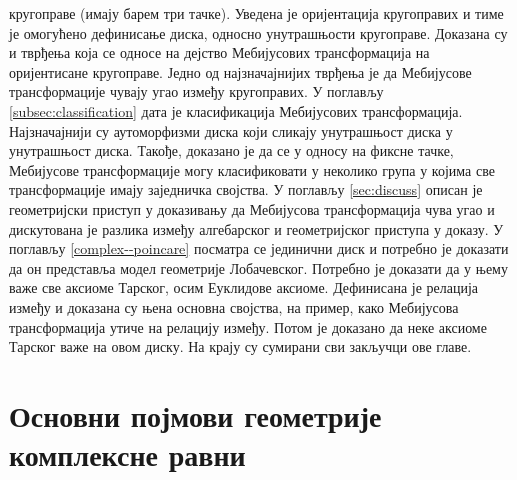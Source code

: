 кругоправе (имају барем три тачке). Уведена је оријентација
кругоправих и тиме је омогућено дефинисање диска, односно унутрашњости
кругоправе. Доказана су и тврђења која се односе на дејство
Мебијусових трансформација на оријентисане кругоправе. Једно од
најзначајнијих тврђења је да Мебијусове трансформације чувају угао
између кругоправих. У поглављу \ref{subsec:classification} дата је
класификација Мебијусових трансформација. Најзначајнији су
аутоморфизми диска који сликају унутрашњост диска у унутрашњост
диска. Такође, доказано је да се у односу на фиксне тачке, Мебијусове
трансформације могу класификовати у неколико група у којима све
трансформације имају заједничка својства. У поглављу \ref{sec:discuss}
описан је геометријски приступ у доказивању да Мебијусова
трансформација чува угао и дискутована је разлика између алгебарског и
геометријског приступа у доказу. У поглављу \ref{complex--poincare}
посматра се јединични диск и потребно је доказати да он представља модел
геометрије Лобачевског. Потребно је доказати да у њему важе све
аксиоме Тарског, осим Еуклидове аксиоме. Дефинисана је релација између
и доказана су њена основна својства, на пример, како Мебијусова
трансформација утиче на релацију између. Потом је доказано да неке
аксиоме Тарског важе на овом диску. На крају су сумирани сви закључци
ове главе.

\section{Основни појмови геометрије комплексне равни}
\label{complex-osnove}


